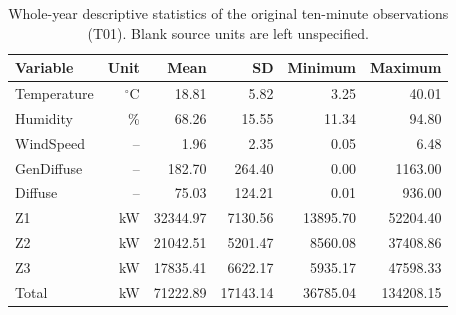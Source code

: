 \begin{table}[H]\centering\small
\caption{Whole-year descriptive statistics of the original ten-minute observations (T01). Blank source units are left unspecified.}\label{tab:descriptive}
\setlength{\tabcolsep}{4pt}
\begin{tabular}{lrrrrr}
\toprule
Variable & Unit & Mean & SD & Minimum & Maximum \\
\midrule
Temperature & $^\circ$C & \num{18.81} & \num{5.82} & \num{3.25} & \num{40.01} \\
Humidity & \% & \num{68.26} & \num{15.55} & \num{11.34} & \num{94.80} \\
WindSpeed & -- & \num{1.96} & \num{2.35} & \num{0.05} & \num{6.48} \\
GenDiffuse & -- & \num{182.70} & \num{264.40} & \num{0.00} & \num{1163.00} \\
Diffuse & -- & \num{75.03} & \num{124.21} & \num{0.01} & \num{936.00} \\
Z1 & kW & \num{32344.97} & \num{7130.56} & \num{13895.70} & \num{52204.40} \\
Z2 & kW & \num{21042.51} & \num{5201.47} & \num{8560.08} & \num{37408.86} \\
Z3 & kW & \num{17835.41} & \num{6622.17} & \num{5935.17} & \num{47598.33} \\
Total & kW & \num{71222.89} & \num{17143.14} & \num{36785.04} & \num{134208.15} \\
\bottomrule\end{tabular}
\end{table}
